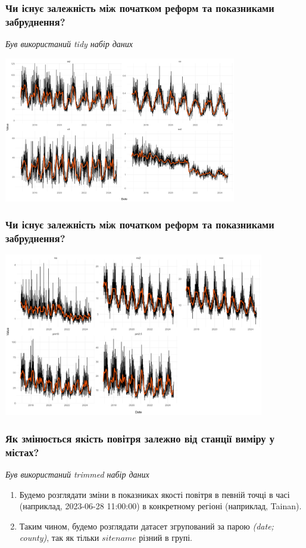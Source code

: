\documentclass{beamer}
\begin{document}

\begin{frame}
  \frametitle{Чи існує залежність між початком реформ та показниками забруднення?}

  \textit{Був використаний tidy набір даних}

  \begin{center}
    \includegraphics[height=2.5in]{plots/question6/line-p1.png}
  \end{center}
\end{frame}

\begin{frame}
  \frametitle{Чи існує залежність між початком реформ та показниками забруднення?}

  \begin{center}
    \includegraphics[height=2.8in]{plots/question6/line-p2.png}
  \end{center}
\end{frame}


\begin{frame}
  \frametitle{Як змінюється якість повітря залежно від станції виміру у містах?}

  \textit{Був використаний trimmed набір даних}

  \begin{enumerate}
    \item Будемо розглядати зміни в показниках якості повітря в певній точці в часі (наприклад, 2023-06-28 11:00:00) в
    конкретному регіоні (наприклад, Tainan).
    \item Таким чином, будемо розглядати датасет згрупований за парою \textit{(date; county)}, так як тільки $sitename$ різний в групі.
  \end{enumerate}
\end{frame}
\end{document}
